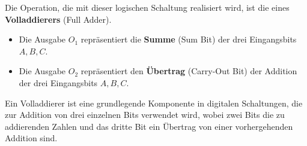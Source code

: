 \documentclass{article}
\begin{document}
Die Operation, die mit dieser logischen Schaltung realisiert wird, ist die eines \textbf{Volladdierers} (Full Adder).
\begin{itemize}
    \item Die Ausgabe $O_1$ repräsentiert die \textbf{Summe} (Sum Bit) der drei Eingangsbits $A, B, C$.
    \item Die Ausgabe $O_2$ repräsentiert den \textbf{Übertrag} (Carry-Out Bit) der Addition der drei Eingangsbits $A, B, C$.
\end{itemize}
Ein Volladdierer ist eine grundlegende Komponente in digitalen Schaltungen, die zur Addition von drei einzelnen Bits verwendet wird, wobei zwei Bits die zu addierenden Zahlen und das dritte Bit ein Übertrag von einer vorhergehenden Addition sind.

\end{document}
